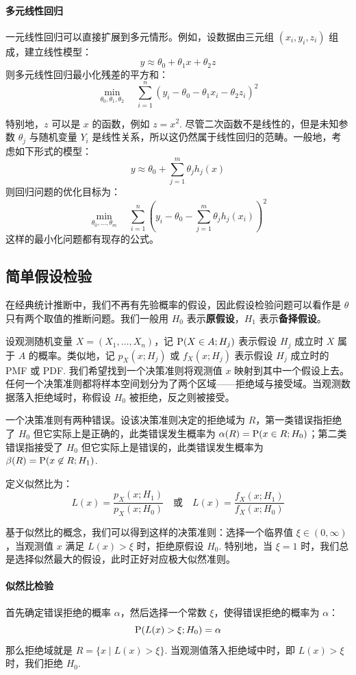 \paragraph{多元线性回归}
一元线性回归可以直接扩展到多元情形。例如，设数据由三元组 $(x_i,y_i,z_i)$ 组成，建立线性模型：
\[
y\approx\theta_0+\theta_1x+\theta_2z
\]
则多元线性回归最小化残差的平方和：
\[
\min_{\theta_0,\theta_1,\theta_2}\quad\sum_{i=1}^n(y_i-\theta_0-\theta_1x_i-\theta_2z_i)^2
\]

特别地，$z$ 可以是 $x$ 的函数，例如 $z=x^2$. 尽管二次函数不是线性的，但是未知参数 $\theta_j$ 与随机变量 $Y_i$ 是线性关系，所以这仍然属于线性回归的范畴。一般地，考虑如下形式的模型：
\[
y\approx\theta_0+\sum_{j=1}^m\theta_jh_j(x)
\]
则回归问题的优化目标为：
\[
\min_{\theta_0,\ldots,\theta_m}\quad\sum_{i=1}^n\left(y_i-\theta_0-\sum_{j=1}^m\theta_jh_j(x_i)\right)^2
\]
这样的最小化问题都有现存的公式。


\subsection{简单假设检验}

在经典统计推断中，我们不再有先验概率的假设，因此假设检验问题可以看作是 $\theta$ 只有两个取值的推断问题。我们一般用 $H_0$ 表示\textbf{原假设}，$H_1$ 表示\textbf{备择假设}。

设观测随机变量 $X=(X_1,\ldots,X_n)$，记 $\mathrm{P}(X\in A;H_j)$ 表示假设 $H_j$ 成立时 $X$ 属于 $A$ 的概率。类似地，记 $p_X(x;H_j)$ 或 $f_X(x;H_j)$ 表示假设 $H_j$ 成立时的 PMF 或 PDF. 我们希望找到一个决策准则将观测值 $x$ 映射到其中一个假设上去。任何一个决策准则都将样本空间划分为了两个区域——拒绝域与接受域。当观测数据落入拒绝域时，称假设 $H_0$ 被拒绝，反之则被接受。

一个决策准则有两种错误。设该决策准则决定的拒绝域为 $R$，第一类错误指拒绝了 $H_0$ 但它实际上是正确的，此类错误发生概率为 $\alpha(R)=\mathrm{P}(x\in R;H_0)$；第二类错误指接受了 $H_0$ 但它实际上是错误的，此类错误发生概率为 $\beta(R)=\mathrm{P}(x\not\in R;H_1)$.

\begin{definition}[似然比]
定义似然比为：
\[
L(x)=\frac{p_X(x;H_1)}{p_X(x;H_0)}\quad\text{或}\quad L(x)=\frac{f_X(x;H_1)}{f_X(x;H_0)}
\]
\end{definition}

基于似然比的概念，我们可以得到这样的决策准则：选择一个临界值 $\xi\in(0,\infty)$，当观测值 $x$ 满足 $L(x)>\xi$ 时，拒绝原假设 $H_0$. 特别地，当 $\xi=1$ 时，我们总是选择似然最大的假设，此时正好对应极大似然准则。

\paragraph{似然比检验}
首先确定错误拒绝的概率 $\alpha$，然后选择一个常数 $\xi$，使得错误拒绝的概率为 $\alpha$：
\[
\mathrm{P}(L(x)>\xi;H_0)=\alpha
\]
那么拒绝域就是 $R=\{x\mid L(x)>\xi\}$. 当观测值落入拒绝域中时，即 $L(x)>\xi$ 时，我们拒绝 $H_0$.

